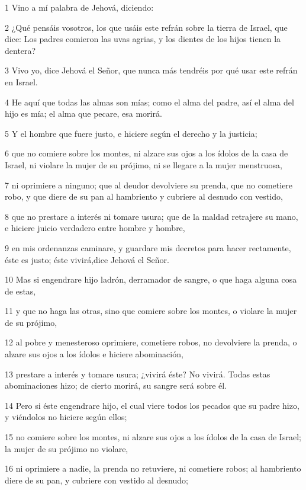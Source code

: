 \par 1 Vino a mí palabra de Jehová, diciendo:
\par 2 ¿Qué pensáis vosotros, los que usáis este refrán sobre la tierra de Israel, que dice: Los padres comieron las uvas agrias, y los dientes de los hijos tienen la dentera?
\par 3 Vivo yo, dice Jehová el Señor, que nunca más tendréis por qué usar este refrán en Israel.
\par 4 He aquí que todas las almas son mías; como el alma del padre, así el alma del hijo es mía; el alma que pecare, esa morirá.
\par 5 Y el hombre que fuere justo, e hiciere según el derecho y la justicia;
\par 6 que no comiere sobre los montes, ni alzare sus ojos a los ídolos de la casa de Israel, ni violare la mujer de su prójimo, ni se llegare a la mujer menstruosa,
\par 7 ni oprimiere a ninguno; que al deudor devolviere su prenda, que no cometiere robo, y que diere de su pan al hambriento y cubriere al desnudo con vestido,
\par 8 que no prestare a interés ni tomare usura; que de la maldad retrajere su mano, e hiciere juicio verdadero entre hombre y hombre,
\par 9 en mis ordenanzas caminare, y guardare mis decretos para hacer rectamente, éste es justo; éste vivirá,dice Jehová el Señor.
\par 10 Mas si engendrare hijo ladrón, derramador de sangre, o que haga alguna cosa de estas,
\par 11 y que no haga las otras, sino que comiere sobre los montes, o violare la mujer de su prójimo,
\par 12 al pobre y menesteroso oprimiere, cometiere robos, no devolviere la prenda, o alzare sus ojos a los ídolos e hiciere abominación,
\par 13 prestare a interés y tomare usura; ¿vivirá éste? No vivirá. Todas estas abominaciones hizo; de cierto morirá, su sangre será sobre él.
\par 14 Pero si éste engendrare hijo, el cual viere todos los pecados que su padre hizo, y viéndolos no hiciere según ellos;
\par 15 no comiere sobre los montes, ni alzare sus ojos a los ídolos de la casa de Israel; la mujer de su prójimo no violare,
\par 16 ni oprimiere a nadie, la prenda no retuviere, ni cometiere robos; al hambriento diere de su pan, y cubriere con vestido al desnudo;
